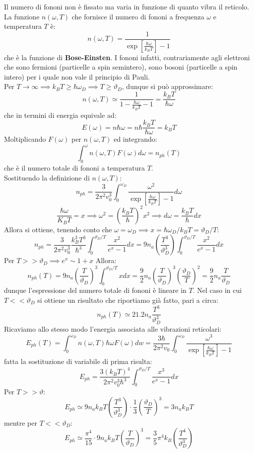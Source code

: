 \documentclass{book}
\begin{document}
            Il numero di fononi non è fissato ma varia in funzione di quanto vibra il reticolo. La funzione $n(\omega, T)$ che fornisce il numero di fononi a frequenza $\omega$ e temperatura $T$ è:
            $$n(\omega, T) = \frac{1}{\exp{[\frac{\hbar \omega}{k_{B}T}]}-1}$$
            che è la funzione di \textbf{Bose-Einsten}. I fononi infatti, contrariamente agli elettroni che sono fermioni (particelle a spin semintero), sono bosoni (particelle a spin intero) per i quale non vale il principio di Pauli.\\
            Per $T \to \infty \implies k_{B}T \geq \hbar \omega_{D} \implies T \geq \vartheta_{D}$, dunque si può approssimare:
            $$n(\omega, T) \simeq \frac{1}{1 - \frac{\hbar \omega}{k_{B}T} -1} = \frac{k_{B}T}{\hbar \omega}$$
            che in termini di energia equivale ad:
            $$E(\omega) = n \hbar \omega = n \hbar \frac{k_{B}T}{\hbar \omega} = k_{B}T$$
            Moltiplicando $F(\omega)$ per $n(\omega, T)$ ed integrando:
            $$\int_{0} ^{\omega} n(\omega, T) F(\omega) d \omega = n_{ph}(T)$$
            che è il numero totale di fononi a temperatura $T$.\\
            Sostituendo la definizione di $n(\omega, T)$:
            $$n_{ph} = \frac{3}{2 \pi^{2} v_{0} ^{3}} \int_{0} ^{\omega_{D}} \frac{\omega ^{2}}{\exp{[\frac{\hbar \omega}{k_{B}T}]}-1}d\omega$$
            $$\frac{\hbar \omega}{K_{B}T} = x \implies \omega^{2} = (\frac{k_{B}T}{\hbar})^{2}x^{2} \implies d \omega = \frac{k_{B}T}{\hbar} dx$$
            Allora si ottiene, tenendo conto che $\omega = \omega_{D} \implies x = \hbar \omega_{D}/k_{B}T = \vartheta_{D}/T$:
            $$n_{ph} = \frac{3}{2 \pi^{2}v_{0} ^{3}} \frac{k_{B} ^{3}T^{3}}{\hbar ^{3}} \int_{0} ^{\vartheta_{D}/T} \frac{x^{2}}{e^{x}-1}dx = 9n_{a}(\frac{T^{3}}{\vartheta_{D} ^{3}}) \int_{0} ^{\vartheta_{D}/T}  \frac{x^{2}}{e^{x}-1}dx$$
            Per $T >> \vartheta_{D} \implies e^{x} \sim 1+x$
            Allora:
            $$n_{ph}(T) = 9n_{a} (\frac{T}{\vartheta_{D}})^{3} \int_{0} ^{\vartheta_{D}/T} xdx = \frac{9}{2}n_{a} (\frac{T}{\vartheta_{D}})^{3}(\frac{\vartheta_{D}}{T})^{2} = \frac{9}{2} n_{a}\frac{T}{\vartheta_{D}}$$
            dunque l'espressione del numero totale di fononi è lineare in $T$.
            Nel caso in cui $T << \vartheta_{D}$ si ottiene un risultato che riportiamo già fatto, pari a circa:
            $$n_{ph}(T) \simeq 21.2n_{a}\frac{T^{3}}{\vartheta_{D} ^{3}}$$
            Ricaviamo allo stesso modo l'energia associata alle vibrazioni reticolari:
            $$E_{ph}(T) = \int_{0} ^{\omega_{D}} n(\omega, T) \hbar \omega F(\omega)dw = \frac{3 \hbar}{2 \pi^{2}v_{0}}\int_{0} ^{\omega_{D}} \frac{\omega ^{3}}{\exp{[\frac{\hbar \omega}{k_{B}T}]}-1}$$
            fatta la sostituzione di variabile di prima risulta:
            $$E_{ph} = \frac{3 (k_{B}T) ^{4}}{2 \pi^{2}v_{0}^{3}\hbar ^{3}} \int_{0} ^{\vartheta_{D}/T} \frac{x^{3}}{e^{x}-1} dx$$
            Per $T >> \vartheta$:
            $$E_{ph} \simeq 9n_{a} k_{B}T (\frac{T^{3}}{\vartheta_{D} ^{3}}) \cdot \frac{1}{3}(\frac{\vartheta_{D}}{T})^{3}= 3n_{a}k_{B}T$$
            mentre per $T<<\vartheta_{D}$:
            $$E_{ph} \simeq \frac{\pi^{4}}{15} \cdot 9n_{a}k_{B}T(\frac{T}{{\vartheta_{D}}})^{3} = \frac{3}{5}\pi^{4} k_{B}(\frac{T^{4}}{\vartheta_{D} ^{3}})$$
\end{document}
